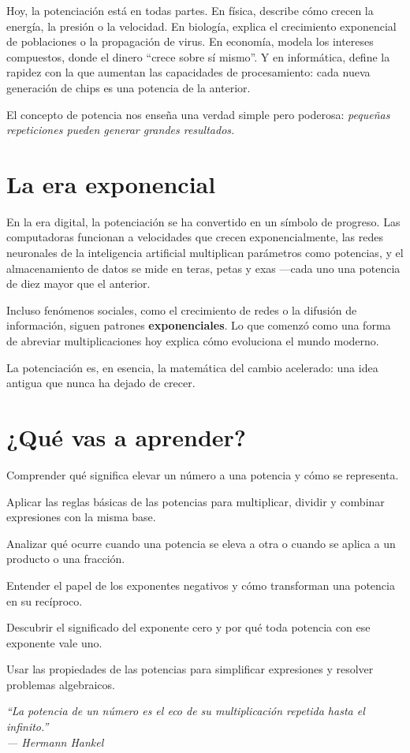 \begin{reseñaplana}
Hoy, la potenciación está en todas partes.  
En física, describe cómo crecen la energía, la presión o la velocidad.  
En biología, explica el crecimiento exponencial de poblaciones o la propagación de virus.  
En economía, modela los intereses compuestos, donde el dinero “crece sobre sí mismo”.  
Y en informática, define la rapidez con la que aumentan las capacidades de procesamiento: 
cada nueva generación de chips es una potencia de la anterior.  

El concepto de potencia nos enseña una verdad simple pero 
poderosa: \textit{pequeñas repeticiones pueden generar grandes resultados.}
\end{reseñaplana}

\section*{La era exponencial} 
\begin{reseñaplana}
En la era digital, la potenciación se ha convertido en un símbolo de progreso.  
Las computadoras funcionan a velocidades que crecen exponencialmente, las redes neuronales de la inteligencia 
artificial multiplican parámetros como potencias, y el almacenamiento de datos se mide en teras, 
petas y exas —cada uno una potencia de diez mayor que el anterior.  

Incluso fenómenos sociales, como el crecimiento de redes o la difusión de información, siguen patrones \textbf{exponenciales}.  
Lo que comenzó como una forma de abreviar multiplicaciones hoy explica cómo evoluciona el mundo moderno.  

La potenciación es, en esencia, la matemática del cambio acelerado:  
una idea antigua que nunca ha dejado de crecer.
\end{reseñaplana}

\section*{¿Qué vas a aprender?}
\begin{aprende}
  \item Comprender qué significa elevar un número a una potencia y cómo se representa.  
  \item Aplicar las reglas básicas de las potencias para multiplicar, dividir y combinar expresiones con la misma base.  
  \item Analizar qué ocurre cuando una potencia se eleva a otra o cuando se aplica a un producto o una fracción.  
  \item Entender el papel de los exponentes negativos y cómo transforman una potencia en su recíproco.  
  \item Descubrir el significado del exponente cero y por qué toda potencia con ese exponente vale uno.  
  \item Usar las propiedades de las potencias para simplificar expresiones y resolver problemas algebraicos.  
\end{aprende}

\vspace{1.2cm} %
\begin{flushright}
  {\fontsize{12}{14}\selectfont\itshape
  ``La potencia de un número es el eco de su multiplicación repetida hasta el infinito.''\\[6pt]
  — Hermann Hankel}%
\end{flushright}



